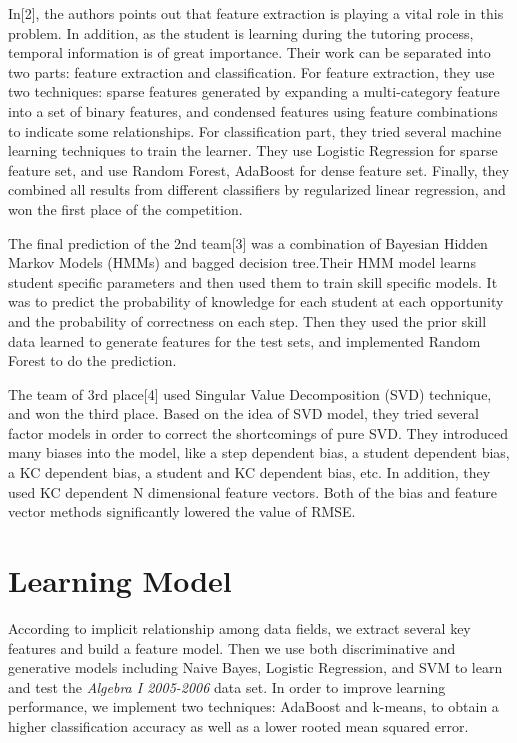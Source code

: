 \documentclass{article} %
\begin{document}
In[2], the authors points out that feature extraction is playing a vital role in this problem. In addition, as the student is learning during the tutoring process, temporal information is of great importance. Their work can be separated into two parts: feature extraction and classification. 
For feature extraction, they use two techniques: sparse features generated by expanding a multi-category feature into a set of binary features, and condensed features using feature combinations to indicate some relationships. For classification part, they tried several machine learning techniques to train the learner. They use Logistic Regression for sparse feature set, and use Random Forest, AdaBoost for dense feature set. Finally, they combined all results from different classifiers by regularized linear regression, and won the first place of the competition.

The final prediction of the 2nd team[3] was a combination of Bayesian Hidden Markov Models (HMMs) and bagged decision tree.Their HMM model learns student specific parameters and then used them to train skill specific models. It was to predict the probability of knowledge for each student at each opportunity and the probability of correctness on each step. Then they used the prior skill data learned to generate features for the test sets, and implemented Random Forest to do the prediction.

The team of 3rd place[4] used Singular Value Decomposition (SVD) technique, and won the third place. Based on the idea of SVD model, they tried several factor models in order to correct the shortcomings of pure SVD. They introduced many biases into the model, like a step dependent bias, a student dependent bias, a KC dependent bias, a student and KC dependent bias, etc. In addition, they used KC dependent N dimensional feature vectors. Both of the bias and feature vector methods significantly lowered the value of RMSE.




\section{Learning Model}
According to implicit relationship among data fields, we extract several key features and build a feature model. Then we use both discriminative and generative models including Naive Bayes, Logistic Regression, and SVM to learn and test the \emph{Algebra I 2005-2006} data set. In order to improve learning performance, we implement  two techniques: AdaBoost and k-means, to obtain a higher classification accuracy as well as a lower rooted mean squared error.
\end{document}
